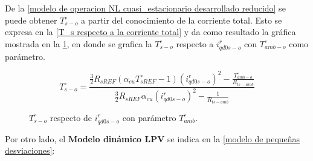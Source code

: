 \documentclass[a4paper, 10pt, onecolumn,journal]{ieeeconf}
\begin{document}
De la \cref{modelo de operacion NL cuasi_estacionario desarrollado reducido}
se puede obtener $T^{\circ}_{s-o}$ a partir del conocimiento de la corriente total. Esto se expresa en la
\cref{T_s respecto a la corriente total} y da como resultado la gráfica mostrada en la \cref{grafica T_s respecto a la corriente}, en donde
se grafica la $T^{\circ}_{s-o}$ respecto a $i^{r}_{qd0s-o}$ con $T^{\circ}_{amb-o}$ como parámetro.

\begin{equation}
    T^{\circ}_{s-o} = \frac{\frac{3}{2}R_{sREF}\left(\alpha_{cu}T^{\circ}_{sREF} - 1\right)\left(i^{r}_{qd0s-o}\right)^2 - \frac{T^{\circ}_{amb-o}}{R_{ts-amb}}}{\frac{3}{2}R_{sREF}\alpha_{cu}\left(i^{r}_{qd0s-o}\right)^2 - \frac{1}{R_{ts-amb}}}
    \label{T_s respecto a la corriente total}
\end{equation}

\begin{figure}[H]
    \centering
    \begin{adjustbox}{scale = 0.6}
    \end{adjustbox}
    \caption{$T^{\circ}_{s-o}$ respecto de $i^r_{qd0s-o}$ con parámetro $T^{\circ}_{amb}$.}
    \label{grafica T_s respecto a la corriente}
\end{figure}

Por otro lado, el \textbf{Modelo dinámico LPV} se indica en la \cref{modelo de pequeñas desviaciones}:
\end{document}
